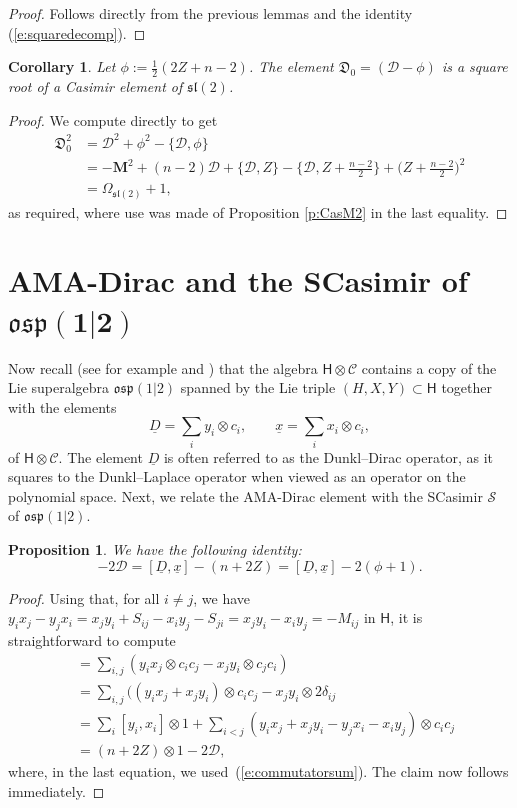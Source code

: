 \documentclass[10pt,a4paper]{amsart}
\numberwithin{equation}{section}
\newtheorem{Corollary}[Theorem]{Corollary}
\newtheorem{Proposition}[Theorem]{Proposition}
 { \theoremstyle{definition}
\newtheorem{Definition}[Theorem]{Definition}
\newtheorem{Note}[Theorem]{Note}
\newtheorem{Example}[Theorem]{Example}
\newtheorem{Remark}[Theorem]{Remark} }
\newcommand{\ux}{\underline{x}}
\newcommand{\uD}{\underline{D}}
\begin{document}
\begin{proof}
Follows directly from the previous lemmas and the identity (\ref{e:squaredecomp}).
\end{proof}

\begin{Corollary}\label{c:DiracSquare}
Let $\phi := \tfrac{1}{2}(2Z + n-2)$. The element $\mathfrak{D}_0 = (\mathcal{D} - \phi)$ is a square root of a Casimir element of $\mathfrak{sl}(2)$.
\end{Corollary}

\begin{proof}
We compute directly to get
\begin{align*}
 \mathfrak{D}_0^2 &= \mathcal{D}^2 + \phi^2 -\{\mathcal{D},\phi\}\\
 &= -\mathbf{M}^2 + (n-2)\mathcal{D} + \{\mathcal{D},Z\} - \big\{\mathcal{D},Z + \tfrac{n-2}{2}\big\} + \big(Z + \tfrac{n-2}{2}\big)^2\\
 &= \Omega_{\mathfrak{sl}(2)} + 1,
\end{align*}
as required, where use was made of Proposition \ref{p:CasM2} in the last equality.
\end{proof}

\section[AMA-Dirac and the SCasimir of osp(1|2)]{AMA-Dirac and the SCasimir of $\boldsymbol{\mathfrak{osp}(1|2)}$}\label{s:SCasimir}
Now recall (see for example \cite{DOV18a} and \cite{DOV18b}) that the algebra $\mathsf{H}\otimes\mathcal{C}$ contains a copy of the Lie superalgebra $\mathfrak{osp}(1|2)$ spanned by the Lie triple $(H,X,Y)\subset \mathsf{H}$ together with the elements
\[
\uD = \sum_i y_i\otimes c_i,\qquad \ux =\sum_i x_i\otimes c_i,
\]
of $\mathsf{H}\otimes\mathcal{C}$. The element $\uD$ is often referred to as the Dunkl--Dirac operator, as it squares to the Dunkl--Laplace operator when viewed as an operator on the polynomial space. Next, we relate the AMA-Dirac element with the SCasimir $\mathcal{S}$ of $\mathfrak{osp}(1|2)$.

\begin{Proposition}
We have the following identity:
\[-2\mathcal{D} = [\uD,\ux] - (n+2Z) = [\uD,\ux] - 2(\phi+1).\]
\end{Proposition}

\begin{proof}
Using that, for all $i\neq j$, we have $y_ix_j - y_jx_i = x_jy_i +S_{ij} - x_iy_j - S_{ji} = x_jy_i - x_iy_j = -M_{ij}$ in $\mathsf{H}$, it is straightforward to compute
\begin{align*}
 [\uD,\ux] &= \sum_{i,j}(y_ix_j\otimes c_ic_j - x_jy_i\otimes c_jc_i)\\
 &=\sum_{i,j}( (y_ix_j + x_jy_i)\otimes c_ic_j -x_jy_i\otimes 2\delta_{ij}\\
 &=\sum_i[y_i,x_i]\otimes 1 + \sum_{i< j}(y_ix_j + x_jy_i - y_jx_i - x_iy_j)\otimes c_ic_j\\
 &=(n+2Z)\otimes 1 -2\mathcal{D},
\end{align*}
where, in the last equation, we used~(\ref{e:commutatorsum}). The claim now follows immediately.
\end{proof}
\end{document}
